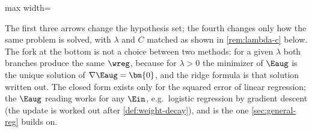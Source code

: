 \begin{center}
\begin{adjustbox}{max width=\textwidth}
    \end{adjustbox}
\end{center}

The first three arrows change the hypothesis set; the fourth changes only how
the same problem is solved, with \(\lambda\) and \(C\) matched as shown in
\autoref{rem:lambda-c} below. The fork at the bottom is not a choice between
two methods: for a given \(\lambda\) both branches produce the same
\(\wreg\), because for \(\lambda > 0\) the minimizer of \(\Eaug\) is the unique
solution of \(\nabla \Eaug = \bm{0}\), and the ridge formula is that solution
written out. The closed form exists only for the squared error of linear
regression; the \(\Eaug\) reading works for any \(\Ein\), e.g.\ logistic
regression by gradient descent (the update is worked out after
\autoref{def:weight-decay}), and is the one \autoref{sec:general-reg} builds
on.

